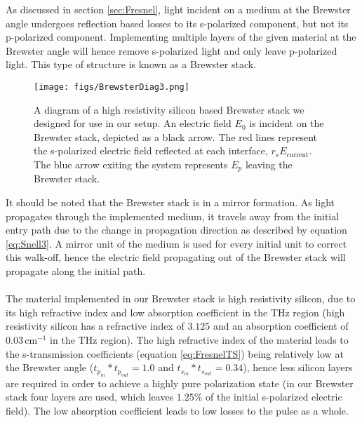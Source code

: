 As discussed in section \ref{sec:Fresnel}, light incident on a medium at the Brewster angle undergoes reflection based losses to its s-polarized component, but not its p-polarized component. 
Implementing multiple layers of the given material at the Brewster angle will hence remove s-polarized light and only leave p-polarized light. This type of structure is known as a Brewster stack.

\begin{figure}[H]
\begin{center}
	 \texttt{[image: figs/BrewsterDiag3.png]}
	 \caption{A diagram of a high resistivity silicon based Brewster stack we designed for use in our setup. An electric field $E_{0}$ is incident on the Brewster stack, depicted as a black arrow. The red lines represent the s-polarized electric field reflected at each interface, $r_{s}E_{\text{current}}$. The blue arrow exiting the system represents $E_{p}$ leaving the Brewster stack.}
   \label{fig:BrewDia}
\end{center}
\end{figure}

It should be noted that the Brewster stack is in a mirror formation. As light propagates through the implemented medium, it travels away from the initial entry path due to the change in propagation direction as described by equation \ref{eq:Snell3}. A mirror unit of the medium is used for every initial unit to correct this walk-off, hence the electric field propagating out of the Brewster stack will propagate along the initial path.
\paragraph{}
The material implemented in our Brewster stack is high resistivity silicon, due to its high refractive index and low absorption coefficient in the THz region (high resistivity silicon has a refractive index of $3.125$ and an absorption coefficient of $0.03\,\text{cm}^{-1}$ in the THz region\cite{Li-2008}). The high refractive index of the material leads to the s-transmission coefficients (equation \ref{eq:FresnelTS}) being relatively low at the Brewster angle ($t_{p_{in}}*t_{p_{out}} = 1.0$ and $t_{s_{in}}*t_{s_{out}} = 0.34$), hence less silicon layers are required in order to achieve a highly pure polarization state (in our Brewster stack four layers are used, which leaves $1.25\%$ of the initial s-polarized electric field). The low absorption coefficient leads to low losses to the pulse as a whole. 

